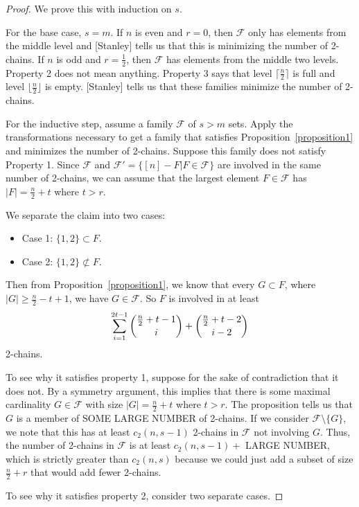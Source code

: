 \documentclass[12pt]{article}
\theoremstyle{plain}
\theoremstyle{definition}
\theoremstyle{remark}
\newcommand{\F}{\mathcal{F}}
\begin{document}
\begin{proof}
We prove this with induction on $s$.

For the base case, $s = m$. If $n$ is even and $r = 0$, then $\F$ only has elements from the middle level and [Stanley] tells us that this is minimizing the number of 2-chains. If $n$ is odd and $r = \frac{1}{2}$, then $\F$ has elements from the middle two levels. Property 2 does not mean anything. Property 3 says that level $\lceil \frac{n}{2} \rceil$ is full and level $\lfloor \frac{n}{2} \rfloor$ is empty. [Stanley] tells us that these families minimize the number of 2-chains. 

For the inductive step, assume a family $\F$ of $s > m$ sets. Apply the transformations necessary to get a family that satisfies Proposition~\ref{proposition1} and minimizes the number of 2-chains. Suppose this family does not satisfy Property 1. Since $\F$ and $\F' = \{ [n] - F | F \in \F \}$ are involved in the same number of 2-chains, we can assume that the largest element $F \in \F$ has $|F| = \frac{n}{2} + t$ where $t > r$. 

We separate the claim into two cases:

\begin{itemize}
\item Case 1: $\{1, 2\} \subset F$.
\item Case 2: $\{ 1, 2\} \not\subset F$.
\end{itemize}

Then from Proposition~\ref{proposition1}, we know that every $G \subset F$, where $|G| \geq \frac{n}{2}-t+1$, we have $G \in \F$. So $F$ is involved in at least
\[ \sum_{i=1}^{2t-1} \dbinom{\frac{n}{2}+t - 1}{i} + \dbinom{\frac{n}{2}+t-2}{i-2}\]
2-chains. 

To see why it satisfies property 1, suppose for the sake of contradiction that it does not. By a symmetry argument, this implies that there is some maximal cardinality $G \in \F$ with size $|G| = \frac{n}{2} + t$ where $t > r$. The proposition tells us that $G$ is a member of SOME LARGE NUMBER of 2-chains. If we consider $\F \setminus \{G\}$, we note that this has at least $c_2(n,s-1)$ 2-chains in $\F$ not involving $G$. Thus, the number of 2-chains in $\F$ is at least $c_2(n,s-1) + $ LARGE NUMBER, which is strictly greater than $c_2(n,s)$ because we could just add a subset of size $\frac{n}{2} + r$ that would add fewer 2-chains.

To see why it satisfies property 2, consider two separate cases. 

\end{proof}
\end{document}

